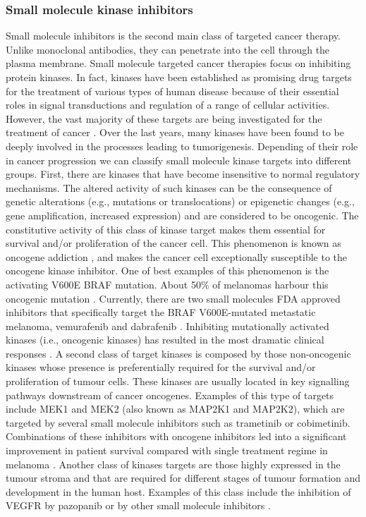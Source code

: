 \documentclass[11pt, b5paper,twoside]{tesi_upf}
\begin{document}
\subsubsection{Small molecule kinase inhibitors}\label{kinases}

\par Small molecule inhibitors is the second main class of targeted cancer therapy.  Unlike monoclonal antibodies, they can penetrate into the cell through the plasma membrane. Small molecule targeted cancer therapies focus on inhibiting protein kinases. In fact, kinases have been established as promising drug targets for the treatment of various types of human disease because of their essential roles in signal transductions and regulation of a range of cellular activities. However, the vast majority of these targets are being investigated for the treatment of cancer \cite{Zhang2009}.  Over the last years,  many kinases have been found to be deeply involved in the processes leading to tumorigenesis. Depending of their role in cancer progression we can classify small molecule kinase targets into different groups.  First, there are kinases that have become insensitive to normal regulatory mechanisms. The altered activity of such kinases can be the consequence of genetic alterations (e.g., mutations or translocations) or epigenetic changes (e.g., gene amplification, increased expression) and are considered to be oncogenic. The constitutive activity of this class of kinase target makes them essential for survival and/or proliferation of the cancer cell. This phenomenon is known as oncogene addiction \cite{Weinstein2006}, and makes the cancer cell exceptionally susceptible to the oncogene kinase inhibitor. One of best examples of this phenomenon is the activating V600E BRAF mutation. About 50$\%$ of melanomas harbour this oncogenic mutation \cite{Ascierto2012}. Currently, there are two small molecules FDA approved inhibitors that specifically target the BRAF V600E-mutated metastatic melanoma, vemurafenib \cite{Bollag2010} and dabrafenib \cite{Gibney2013}. Inhibiting mutationally activated kinases (i.e., oncogenic kinases) has resulted in the most dramatic clinical responses \cite{Zhang2009}.  A second class of target kinases is composed by those non-oncogenic kinases whose presence is preferentially required for the survival and/or proliferation of tumour cells.  These kinases are usually located in key signalling pathways downstream of cancer oncogenes. Examples of this type of targets include MEK1 and MEK2 (also known as MAP2K1 and MAP2K2), which are targeted by several small molecule inhibitors such as trametinib or cobimetinib. Combinations of these inhibitors with oncogene inhibitors led into a significant improvement in patient survival compared with single treatment regime in melanoma \cite{Flaherty2012, Flaherty2012a}. Another class of kinases targets are those highly expressed in the tumour stroma and that are required for different stages of tumour formation and development in the human host. Examples of this class include the inhibition of VEGFR by pazopanib or by other small molecule inhibitors \cite{Ivy2009}.
 
\end{document}
